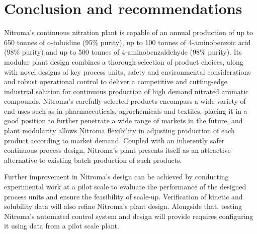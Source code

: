 \section*{Conclusion and recommendations}
Nitroma's continuous nitration plant is capable of an annual production of up to 650 tonnes of o-toluidine (95\% purity), up to 100 tonnes of 4-aminobenzoic acid (98\% purity) and up to 500 tonnes of 4-aminobenzaldehyde (98\% purity). Its modular plant design combines a thorough selection of product choices, along with novel designs of key process units, safety and environmental considerations and robust operational control to deliver a competitive and cutting-edge industrial solution for continuous production of high demand nitrated aromatic compounds. Nitroma's carefully selected products encompass a wide variety of end-uses such as in pharmaceuticals, agrochemicals and textiles, placing it in a good position to further penetrate a wide range of markets in the future, and plant modularity allows Nitroma flexibility in adjusting production of each product according to market demand. Coupled with an inherently safer continuous process design, Nitroma's plant presents itself as an attractive alternative to existing batch production of such products.

Further improvement in Nitroma's design can be achieved by conducting experimental work at a pilot scale to evaluate the performance of the designed process units and ensure the feasibility of scale-up. Verification of kinetic and solubility data will also refine Nitroma's plant design. Alongside that, testing Nitroma's automated control system and  design will provide  requires configuring it using data from a pilot scale plant. 

